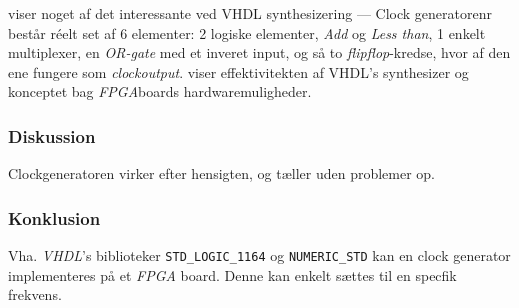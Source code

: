 { viser noget af det interessante ved VHDL synthesizering --- Clock generatorenr består réelt set af 6 elementer: 2 logiske elementer, \emph{Add} og \emph{Less than}, 1 enkelt multiplexer, en \emph{OR-gate} med et inveret input, og så to \emph{flipflop}-kredse, hvor af den ene fungere som \emph{clockoutput}.  viser effektivitekten af VHDL's synthesizer og konceptet bag \emph{FPGA}boards hardwaremuligheder.

\subsubsection{Diskussion}
Clockgeneratoren virker efter hensigten, og tæller uden problemer op.

\subsubsection{Konklusion}

Vha. \emph{VHDL}'s biblioteker  \texttt{STD\_LOGIC\_1164} og \texttt{NUMERIC\_STD} kan en clock generator implementeres på et \emph{FPGA} board. Denne kan enkelt sættes til en specfik frekvens.
}